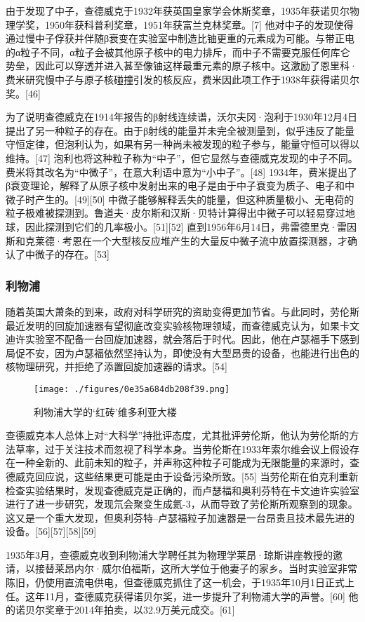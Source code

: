 由于发现了中子，查德威克于1932年获英国皇家学会休斯奖章，1935年获诺贝尔物理学奖，1950年获科普利奖章，1951年获富兰克林奖章。[7] 他对中子的发现使得通过慢中子俘获并伴随β衰变在实验室中制造比铀更重的元素成为可能。与带正电的α粒子不同，α粒子会被其他原子核中的电力排斥，而中子不需要克服任何库仑势垒，因此可以穿透并进入甚至像铀这样最重元素的原子核中。这激励了恩里科·费米研究慢中子与原子核碰撞引发的核反应，费米因此项工作于1938年获得诺贝尔奖。[46]

为了说明查德威克在1914年报告的β射线连续谱，沃尔夫冈·泡利于1930年12月4日提出了另一种粒子的存在。由于β射线的能量并未完全被测量到，似乎违反了能量守恒定律，但泡利认为，如果有另一种尚未被发现的粒子参与，能量守恒可以得以维持。[47] 泡利也将这种粒子称为“中子”，但它显然与查德威克发现的中子不同。费米将其改名为“中微子”，在意大利语中意为“小中子”。[48] 1934年，费米提出了β衰变理论，解释了从原子核中发射出来的电子是由于中子衰变为质子、电子和中微子时产生的。[49][50] 中微子能够解释丢失的能量，但这种质量极小、无电荷的粒子极难被探测到。鲁道夫·皮尔斯和汉斯·贝特计算得出中微子可以轻易穿过地球，因此探测到它们的几率极小。[51][52] 直到1956年6月14日，弗雷德里克·雷因斯和克莱德·考恩在一个大型核反应堆产生的大量反中微子流中放置探测器，才确认了中微子的存在。[53]
\subsubsection{利物浦}
随着英国大萧条的到来，政府对科学研究的资助变得更加节省。与此同时，劳伦斯最近发明的回旋加速器有望彻底改变实验核物理领域，而查德威克认为，如果卡文迪许实验室不配备一台回旋加速器，就会落后于时代。因此，他在卢瑟福手下感到局促不安，因为卢瑟福依然坚持认为，即使没有大型昂贵的设备，也能进行出色的核物理研究，并拒绝了添置回旋加速器的请求。[54]
\begin{figure}[ht]
\centering
\texttt{[image: ./figures/0e35a684db208f39.png]}
\caption{利物浦大学的‘红砖’维多利亚大楼} \label{fig_ZMcdw_3}
\end{figure}
查德威克本人总体上对“大科学”持批评态度，尤其批评劳伦斯，他认为劳伦斯的方法草率，过于关注技术而忽视了科学本身。当劳伦斯在1933年索尔维会议上假设存在一种全新的、此前未知的粒子，并声称这种粒子可能成为无限能量的来源时，查德威克回应说，这些结果更可能是由于设备污染所致。[55] 当劳伦斯在伯克利重新检查实验结果时，发现查德威克是正确的，而卢瑟福和奥利芬特在卡文迪许实验室进行了进一步研究，发现氘会聚变生成氦-3，从而导致了劳伦斯所观察到的现象。这又是一个重大发现，但奥利芬特–卢瑟福粒子加速器是一台昂贵且技术最先进的设备。[56][57][58][59]

1935年3月，查德威克收到利物浦大学聘任其为物理学莱昂·琼斯讲座教授的邀请，以接替莱昂内尔·威尔伯福斯，这所大学位于他妻子的家乡。当时实验室非常陈旧，仍使用直流电供电，但查德威克抓住了这一机会，于1935年10月1日正式上任。这年11月，查德威克获得诺贝尔奖，进一步提升了利物浦大学的声誉。[60] 他的诺贝尔奖章于2014年拍卖，以32.9万美元成交。[61]

